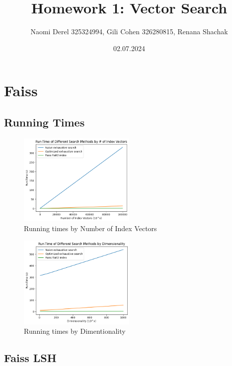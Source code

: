 \documentclass[12pt]{article}
\begin{document}
\title{Homework 1: Vector Search}
\author{Naomi Derel 325324994, Gili Cohen 326280815, Renana Shachak}
\date{02.07.2024}
\maketitle


\section{Faiss}

\subsection{Running Times}

\begin{figure}[h]
    \centering
    \includegraphics[width=0.5\textwidth]{images/1_1_1.png}
    \caption{Running times by Number of Index Vectors}
\end{figure}

\begin{figure}[h]
    \centering
    \includegraphics[width=0.5\textwidth]{images/1_1_2.png}
    \caption{Running times by Dimentionality}
\end{figure}

\subsection{Faiss LSH}
\end{document}
